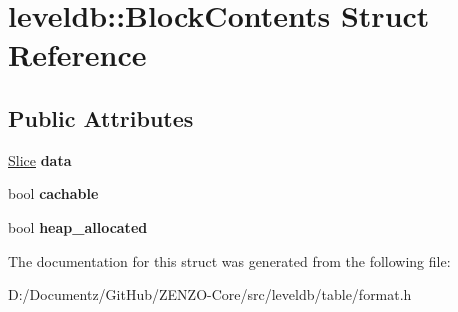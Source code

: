 \hypertarget{structleveldb_1_1_block_contents}{}\section{leveldb\+::Block\+Contents Struct Reference}
\label{structleveldb_1_1_block_contents}
\subsection*{Public Attributes}
\begin{DoxyCompactItemize}
\item 
\mbox{\label{structleveldb_1_1_block_contents_aa30fe6388fe0f89d5565f6bae788c28e}} 
\mbox{\hyperlink{classleveldb_1_1_slice}{Slice}} {\bfseries data}
\item 
\mbox{\label{structleveldb_1_1_block_contents_ad9cbcf81fb1378ce5f9a0db2e8d4b539}} 
bool {\bfseries cachable}
\item 
\mbox{\label{structleveldb_1_1_block_contents_a0d4390fa3d4041ac5a3da51cbb16e315}} 
bool {\bfseries heap\+\_\+allocated}
\end{DoxyCompactItemize}


The documentation for this struct was generated from the following file\+:\begin{DoxyCompactItemize}
\item 
D\+:/\+Documentz/\+Git\+Hub/\+Z\+E\+N\+Z\+O-\/\+Core/src/leveldb/table/format.\+h\end{DoxyCompactItemize}
